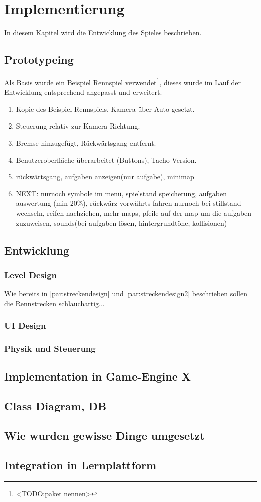 \section{Implementierung}\label{sec:impl}
In diesem Kapitel wird die Entwicklung des Spieles beschrieben.
\subsection{Prototypeing}
	Als Basis wurde ein Beispiel Rennspiel verwendet\footnote{<TODO:paket nennen>}, dieses wurde im Lauf der Entwicklung entsprechend angepasst und erweitert.
	\begin{enumerate}[label=Prototyp \arabic*]
		\item{ Kopie des Beispiel Rennspiels. Kamera über Auto gesetzt. }
		\item{ Steuerung relativ zur Kamera Richtung. }
		\item{ Bremse hinzugefügt, Rückwärtsgang entfernt. }
		\item{ Benutzeroberfläche überarbeitet (Buttons), Tacho Version. }
		\item{ rückwärtsgang, aufgaben anzeigen(nur aufgabe), minimap }
		\item{NEXT: nurnoch symbole im menü, spielstand speicherung, aufgaben auswertung (min 20\%), rückwärz vorwährts fahren nurnoch bei stillstand wechseln, reifen nachziehen, mehr maps, pfeile auf der map um die aufgaben zuzuweisen, sounds(bei aufgaben lösen, hintergrundtöne, kollisionen) }
	\end{enumerate}
\subsection{Entwicklung}
	\subsubsection{Level Design}
		Wie bereits in \ref{par:streckendesign} und \ref{par:streckendesign2} beschrieben sollen die Rennstrecken schlauchartig...
	\subsubsection{UI Design}
	\subsubsection{Physik und Steuerung}
	\subsubsection{}
\subsection{Implementation in Game-Engine X}
\subsection{Class Diagram, DB}
\subsection{Wie wurden gewisse Dinge umgesetzt}
\subsection{Integration in Lernplattform}

